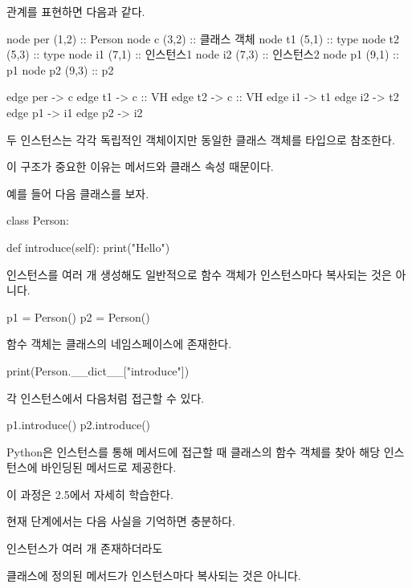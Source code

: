 관계를 표현하면 다음과 같다.

\begin{dhkdiagram}[in=6]
node per (1,2) :: Person
node c (3,2) :: 클래스 객체
node t1 (5,1) :: type
node t2 (5,3) :: type
node i1 (7,1) :: 인스턴스1
node i2 (7,3) :: 인스턴스2
node p1 (9,1) :: p1
node p2 (9,3) :: p2

edge per -> c
edge t1 -> c :: VH
edge t2 -> c :: VH
edge i1 -> t1
edge i2 -> t2
edge p1 -> i1
edge p2 -> i2
\end{dhkdiagram}

두 인스턴스는 각각 독립적인 객체이지만 동일한 클래스 객체를 타입으로 참조한다.

이 구조가 중요한 이유는 메서드와 클래스 속성 때문이다.

예를 들어 다음 클래스를 보자.

\begin{dhkcode}
class Person:

    def introduce(self):
        print("Hello")
\end{dhkcode}

인스턴스를 여러 개 생성해도 일반적으로  함수 객체가 인스턴스마다 복사되는 것은 아니다.

\begin{dhkcode}
p1 = Person()
p2 = Person()
\end{dhkcode}

 함수 객체는 클래스의 네임스페이스에 존재한다.

\begin{dhkcode}
print(Person.__dict__["introduce"])
\end{dhkcode}

각 인스턴스에서 다음처럼 접근할 수 있다.

\begin{dhkcode}
p1.introduce()
p2.introduce()
\end{dhkcode}

Python은 인스턴스를 통해 메서드에 접근할 때 클래스의 함수 객체를 찾아 해당 인스턴스에 바인딩된 메서드로 제공한다.

이 과정은 2.5에서 자세히 학습한다.

현재 단계에서는 다음 사실을 기억하면 충분하다.

\begin{dhksmry}[centered]
인스턴스가 여러 개 존재하더라도 

클래스에 정의된 메서드가 인스턴스마다 복사되는 것은 아니다.
\end{dhksmry}

